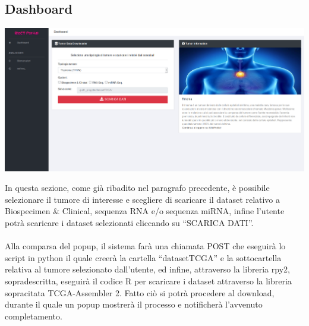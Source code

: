 \documentclass[10pt,a4paper]{report}
\newcommand{\virgolette}[1]{``#1''}
\begin{document}
\subsection{Dashboard}
\begin{center}
\includegraphics[scale=0.18]{Dashboard.png} 
\end{center}
In questa sezione, come già ribadito nel paragrafo precedente, è possibile selezionare il tumore di interesse e scegliere di scaricare il dataset relativo a Biospecimen \& Clinical, sequenza RNA e/o  sequenza miRNA, infine l’utente potrà scaricare i dataset selezionati cliccando su \virgolette{SCARICA DATI}. \\\\ Alla comparsa del popup, il sistema farà una chiamata POST che eseguirà lo script in python il quale creerà la cartella \virgolette{datasetTCGA} e la sottocartella relativa al tumore selezionato dall’utente, ed infine, attraverso la libreria rpy2, sopradescritta, eseguirà il codice R per scaricare i dataset attraverso la libreria sopracitata TCGA-Assembler 2. Fatto ciò si potrà procedere al download, durante il quale un popup mostrerà il processo e notificherà l’avvenuto completamento.
\end{document}
